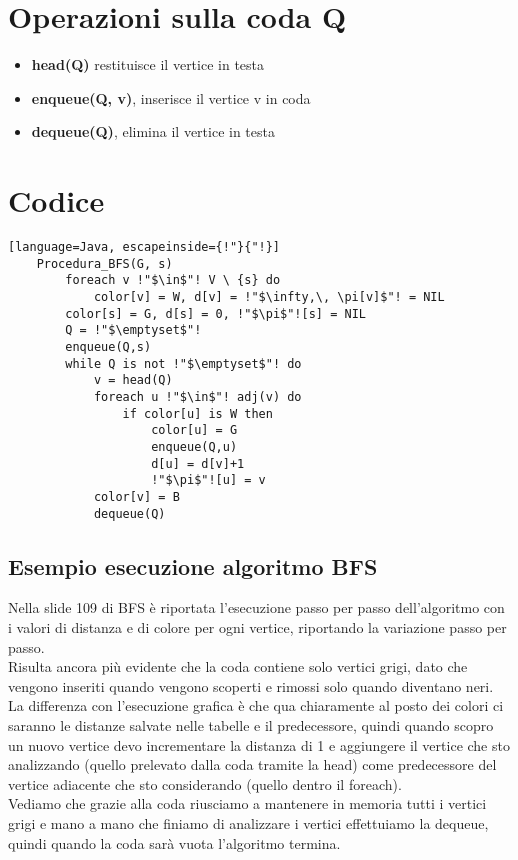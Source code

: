 \section{Operazioni sulla coda Q}
\begin{itemize}
    \item \textbf{head(Q)} restituisce il vertice in testa
    \item \textbf{enqueue(Q, v)}, inserisce il vertice v in coda
    \item \textbf{dequeue(Q)}, elimina il vertice in testa
\end{itemize}
\section{Codice}
\begin{lstlisting}[language=Java, escapeinside={!"}{"!}]
    Procedura_BFS(G, s)
        foreach v !"$\in$"! V \ {s} do
            color[v] = W, d[v] = !"$\infty,\, \pi[v]$"! = NIL
        color[s] = G, d[s] = 0, !"$\pi$"![s] = NIL
        Q = !"$\emptyset$"!
        enqueue(Q,s)
        while Q is not !"$\emptyset$"! do
            v = head(Q)
            foreach u !"$\in$"! adj(v) do
                if color[u] is W then
                    color[u] = G
                    enqueue(Q,u)
                    d[u] = d[v]+1
                    !"$\pi$"![u] = v
            color[v] = B
            dequeue(Q)
\end{lstlisting}
\subsection{Esempio esecuzione algoritmo BFS}
Nella slide 109 di BFS è riportata l'esecuzione passo per passo dell'algoritmo con
i valori di distanza e di colore per ogni vertice, riportando la variazione
passo per passo.\\
Risulta ancora più evidente che la coda contiene solo vertici grigi, dato che vengono inseriti
quando vengono scoperti e rimossi solo quando diventano neri.\\
La differenza con l'esecuzione grafica è che qua chiaramente al posto dei colori ci saranno le distanze
salvate nelle tabelle e il predecessore, quindi quando scopro un nuovo vertice
devo incrementare la distanza di 1 e aggiungere il vertice che sto analizzando 
(quello prelevato dalla coda tramite la head) come predecessore del vertice adiacente che
sto considerando (quello dentro il foreach).\\
Vediamo che grazie alla coda riusciamo a mantenere in memoria tutti i vertici grigi
e mano a mano che finiamo di analizzare i vertici effettuiamo la dequeue, quindi
quando la coda sarà vuota l'algoritmo termina.
